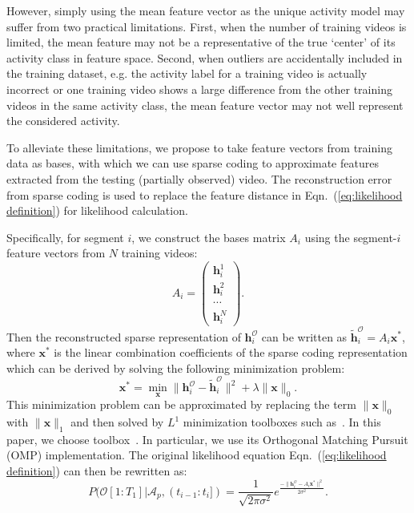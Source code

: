 However, simply using the mean feature vector as the unique activity model may
suffer from two practical limitations.  First, when the number of training
videos is limited, the mean feature may not be a representative of the true
`center' of its activity class in feature space.  Second, when outliers are
accidentally included in the training dataset, e.g. the activity label for a
training video is actually incorrect or one training video shows a large
difference from the other training videos in the same activity class, the mean
feature vector may not well represent the considered activity.

To alleviate these limitations, we propose to take feature vectors from
training data as bases, with which we can use sparse coding to approximate
features extracted from the testing (partially observed) video. The
reconstruction error from sparse coding is {\color{black}used} to replace the
feature distance in Eqn.~(\ref{eq:likelihood definition}) for likelihood
calculation.

Specifically, for segment $i$, we construct the bases matrix $A_i$ using the
segment-$i$ feature {\color{black}vectors} from $N$ training videos:
\begin{equation}
  A_{i} =
  \left (
    \begin{array}{c}
      \mathbf{h}^1_i \\
      \mathbf{h}^2_i \\
      \cdots \\
      \mathbf{h}^N_i
    \end{array}
  \right ).
\end{equation}
Then the reconstructed sparse representation of $\mathbf{h}^{\mathcal{O}}_i$
can be written as $\tilde{\mathbf{h}}^{\mathcal{O}}_i= A_{i}\mathbf{x}^*$,
where $\mathbf{x}^*$ is the linear combination coefficients of the sparse
coding representation which can be derived by solving the following
minimization problem:
\begin{equation}
  \mathbf{x}^* = \min_{\mathbf{x}} \|\mathbf{h}^{\mathcal{O}}_i - \tilde{\mathbf{h}}^{\mathcal{O}}_i\|^2 + \lambda\|\mathbf{x}\|_0.
  \label{eq:sparse_coding}
\end{equation}
This minimization problem can be approximated by replacing the term
$\|\mathbf{x}\|_0$ with $\|\mathbf{x}\|_1$ and then solved by $L^1$
minimization toolboxes such as~\cite{L1benchmark,l1magic}.  In this paper, we
choose toolbox~\cite{L1benchmark}. In particular, we use its Orthogonal
Matching Pursuit (OMP) implementation.  The original likelihood equation
Eqn.~(\ref{eq:likelihood definition}) can then be rewritten as:
\begin{equation}
  P(\mathcal{O}[1:T_1]|\mathcal{A}_p, (t_{i-1}:t_i]) = \frac{1}{\sqrt{2\pi\sigma^2}}e^{\frac{-\|\mathbf{h}^{\mathcal{O}}_i
      -  A_{i}\mathbf{x}^* \|^2}{2\sigma^2}}.
  \label{eq:likelihood_rewritten}
\end{equation}


